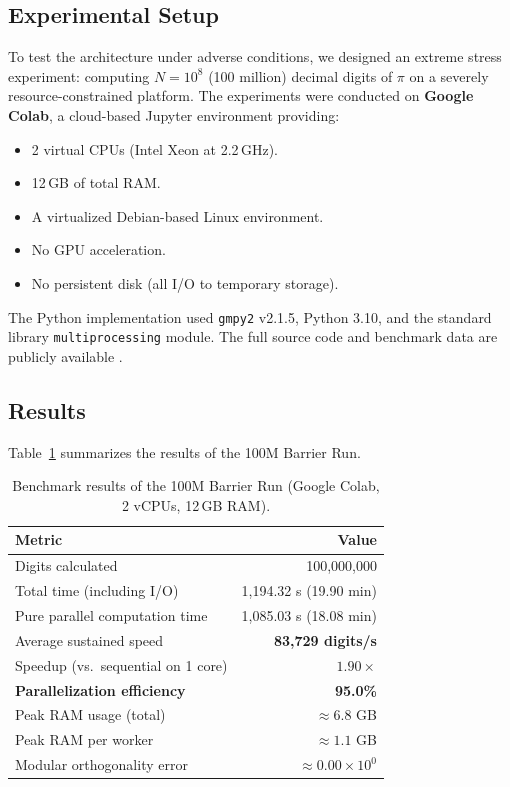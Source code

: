 \documentclass[12pt,a4paper]{article}
\theoremstyle{plain}
\theoremstyle{definition}
\theoremstyle{remark}
\begin{document}
\subsection{Experimental Setup}
To test the architecture under adverse conditions, we designed an extreme stress experiment: computing \(N = 10^8\) (100 million) decimal digits of \(\pi\) on a severely resource-constrained platform. The experiments were conducted on \textbf{Google Colab}, a cloud-based Jupyter environment providing:
\begin{itemize}
    \item 2 virtual CPUs (Intel Xeon at 2.2\,GHz).
    \item 12\,GB of total RAM.
    \item A virtualized Debian-based Linux environment.
    \item No GPU acceleration.
    \item No persistent disk (all I/O to temporary storage).
\end{itemize}
The Python implementation used \texttt{gmpy2} v2.1.5, Python 3.10, and the standard library \texttt{multiprocessing} module. The full source code and benchmark data are publicly available \cite{repo}.

\subsection{Results}
Table~\ref{tab:benchmark} summarizes the results of the 100M Barrier Run.

\begin{table}[H]
\centering
\caption{Benchmark results of the 100M Barrier Run (Google Colab, 2 vCPUs, 12\,GB RAM).}
\label{tab:benchmark}
\begin{tabular}{@{}lr@{}}
\toprule
\textbf{Metric} & \textbf{Value} \\
\midrule
Digits calculated & 100,000,000 \\
Total time (including I/O) & 1,194.32 s (19.90 min) \\
Pure parallel computation time & 1,085.03 s (18.08 min) \\
Average sustained speed & \textbf{83,729 digits/s} \\
Speedup (vs.\ sequential on 1 core) & \(1.90\times\) \\
\textbf{Parallelization efficiency} & \textbf{95.0\%} \\
Peak RAM usage (total) & \(\approx 6.8\) GB \\
Peak RAM per worker & \(\approx 1.1\) GB \\
Modular orthogonality error & \(\approx 0.00 \times 10^{0}\) \\
\bottomrule
\end{tabular}
\end{table}
\end{document}
